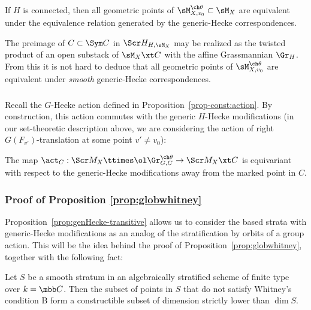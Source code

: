 \begin{prop}[{\cite[Proposition 3.5.1]{GN}}]
\notready
\label{prop:genHecke-transitive}
If $H$ is connected, then all geometric points of $\sM_{X,v_0}^{\ch\theta} \subset \sM_X$
are equivalent under the equivalence relation generated by
the generic-Hecke correspondences.
\end{prop}

The preimage of $C\subset \Sym C$ in $\Scr H_{H,\sM_X}$ may be realized as the
twisted product of an open substack of $\sM_X \xt C$ with the affine Grassmannian
$\Gr_H$. From this it is not hard to deduce that all geometric points of
$\sM_{X,v_0}^{\ch\theta}$ are equivalent under \emph{smooth} generic-Hecke correspondences.

\subsubsection{}
Recall the $G$-Hecke action defined in Proposition~\ref{prop-const:action}.
By construction, this action commutes with the generic $H$-Hecke modifications (in
our set-theoretic description above, we are considering the action of right
$G(F_{v'})$-translation at some point $v' \ne v_0$):

\begin{lem}
\notready \label{lem:act-equivariant}
The map $\act_C : \Scr M_X \ttimes \ol\Gr^{\ch\theta}_{G,C} \to \Scr M_X \xt C$ is equivariant with respect to the generic-Hecke modifications
away from the marked point in $C$.
\end{lem}




\subsubsection{Proof of Proposition \ref{prop:globwhitney}} \label{proof:whitney}

Proposition~\ref{prop:genHecke-transitive} allows us to consider the based strata with
generic-Hecke modifications
as an analog of the stratification by orbits of a group action.
This will be the idea behind the proof of Proposition~\ref{prop:globwhitney}, together
with the following fact:

\begin{thm}
\notready  \label{thm:K}
Let $S$ be a smooth stratum in an algebraically stratified scheme of finite type over $k=\mbb C$.
Then the subset of points in $S$ that do not satisfy Whitney's condition B
form a constructible subset of dimension strictly lower than $\dim S$.
\end{thm}

